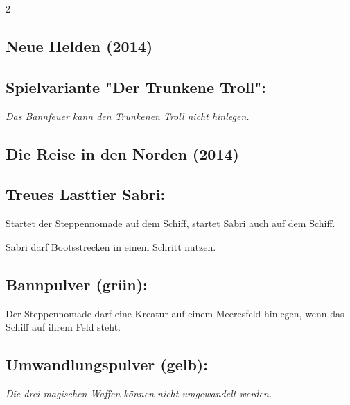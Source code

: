 \documentclass[10pt, a4paper, oneside]{book}
\newcommand{\fan}[1]{\textit{#1}}
\begin{document}
\begin{multicols*}{2}
\begin{bgcolor}
\end{bgcolor}




\begin{nobgcolor}
\section{Neue Helden (2014)}

\subsection{Spielvariante "Der Trunkene Troll":}

\fan{Das Bannfeuer kann den Trunkenen Troll nicht hinlegen.}

\end{nobgcolor}





\begin{bgcolor}
\section{Die Reise in den Norden (2014)}


\subsection{Treues Lasttier Sabri:}

Startet der Steppennomade auf dem Schiff, startet Sabri auch auf dem Schiff. 
\supercite{MH:Begleitheft}

Sabri darf Bootsstrecken in einem Schritt nutzen.
\supercite{MH:Begleitheft}


\subsection{Bannpulver (grün):}

Der Steppennomade darf eine Kreatur auf einem Meeresfeld hinlegen, wenn das Schiff auf ihrem Feld steht.
\supercite{MH:Begleitheft}




\subsection{Umwandlungspulver (gelb):}

\fan{Die drei magischen Waffen können nicht umgewandelt werden.}




\end{bgcolor}
\end{multicols*}
\end{document}
